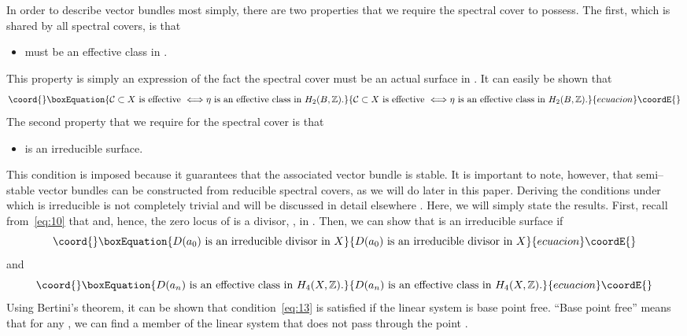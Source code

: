\documentclass[a4paper,12pt]{article}
\numberwithin{equation}{section}
\def\cC{{\mathcal C}}
\def\cO{{\mathcal O}}
\theoremstyle{plain}
\begin{document}
In order to describe vector bundles most simply, there are two properties
that we require the spectral cover to possess. The first, which is shared by
all spectral covers, is that 
\begin{itemize}
\item \myHighlight{$\cC$}\coordHE{} must be an effective class in \coordHE{}.
\end{itemize}
This property is simply an expression of the fact the spectral cover must be
an actual surface in \coordHE{}. It can easily be shown that 
\begin{equation}\coord{}\boxEquation{
\cC \subset X \text{ is effective } \Longleftrightarrow \eta 
\text{ is an effective class in } H_{2}(B, {\mathbb Z}).
\label{eq:12}
}{
\cC \subset X \text{ is effective } \Longleftrightarrow \eta 
\text{ is an effective class in } H_{2}(B, {\mathbb Z}).
}{ecuacion}\coordE{}\end{equation}
The second property that we require for the spectral cover is that
\begin{itemize}
\item \myHighlight{$\cC$}\coordHE{} is an irreducible surface.
\end{itemize}
This condition is imposed because it guarantees that the associated vector
bundle is stable. It is important to note, however, that semi--stable 
vector bundles can be constructed from reducible spectral covers, 
as we will do later in this paper. Deriving the 
conditions under which \myHighlight{$\cC$}\coordHE{} is irreducible is not completely trivial
and will be 
discussed in detail elsewhere \cite{mathpaper}. Here, we will 
simply state the results.
First,  recall from~\eqref{eq:10} that 
\myHighlight{$a_{i} \sim \pi^*K_{B}^{i}\otimes 
\cO(\pi^{*}\eta)$}\coordHE{} and, hence, the zero locus of \coordHE{} is a divisor,
\coordHE{}, in \coordHE{}. Then, we can show that \myHighlight{$\cC$}\coordHE{} is an irreducible surface if
\begin{equation}\coord{}\boxEquation{
D(a_{0}) \text{ is an irreducible divisor in } X
\label{eq:13}
}{
D(a_{0}) \text{ is an irreducible divisor in } X
}{ecuacion}\coordE{}\end{equation}
and
\begin{equation}\coord{}\boxEquation{
D(a_{n}) \text{ is an effective class in } H_{4}(X, {\mathbb Z}).
\label{eq:14}
}{
D(a_{n}) \text{ is an effective class in } H_{4}(X, {\mathbb Z}).
}{ecuacion}\coordE{}\end{equation}
Using Bertini's theorem, it can be shown that condition~\eqref{eq:13} is
satisfied if the linear system \myHighlight{$|\eta|$}\coordHE{} is base point free. 
``Base point free'' means that for any \coordHE{}, we can find a
member of the linear system \myHighlight{$|\eta|$}\coordHE{}  that does not pass through the point \coordHE{}. 
\end{document}
